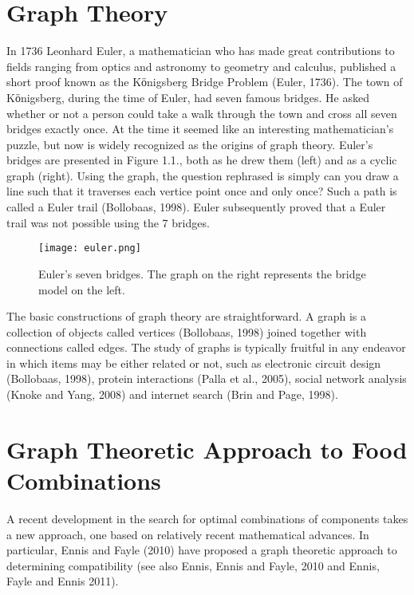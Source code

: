 \section{Graph Theory}
In 1736 Leonhard Euler, a mathematician who has made great contributions to fields ranging from optics and astronomy to geometry and calculus, published a short proof known as the Kӧnigsberg Bridge Problem (Euler, 1736). The town of Kӧnigsberg, during the time of Euler, had seven famous bridges.  He asked whether or not a person could take a walk through the town and cross all seven bridges exactly once.  At the time it seemed like an interesting mathematician’s puzzle, but now is widely recognized as the origins of graph theory. Euler’s bridges are presented in Figure 1.1., both as he drew them (left) and as a cyclic graph (right).  Using the graph, the question rephrased is simply can you draw a line such that it traverses each vertice point once and only once?  Such a path is called a Euler trail (Bollobaas, 1998).  Euler subsequently proved that a Euler trail was not possible using the 7 bridges.

\begin{figure}[h!]
\caption{Euler's seven bridges.  The graph on the right represents the bridge model on the left.}
\centering
\texttt{[image: euler.png]}
\end{figure}


The basic constructions of graph theory are straightforward.  A graph is a collection of objects called vertices (Bollobaas, 1998) joined together with connections called edges.  The study of graphs is typically fruitful in any endeavor in which items may be either related or not, such as electronic circuit design (Bollobaas, 1998),  protein interactions (Palla et al., 2005), social network analysis (Knoke and Yang, 2008) and internet search (Brin and Page, 1998).  

\section{Graph Theoretic Approach to Food Combinations}
A recent development in the search for optimal combinations of components takes a new approach, one based on relatively recent mathematical advances.  In particular, Ennis and Fayle (2010) have proposed a graph theoretic approach to determining compatibility (see also Ennis, Ennis and Fayle, 2010 and Ennis, Fayle and Ennis 2011).


